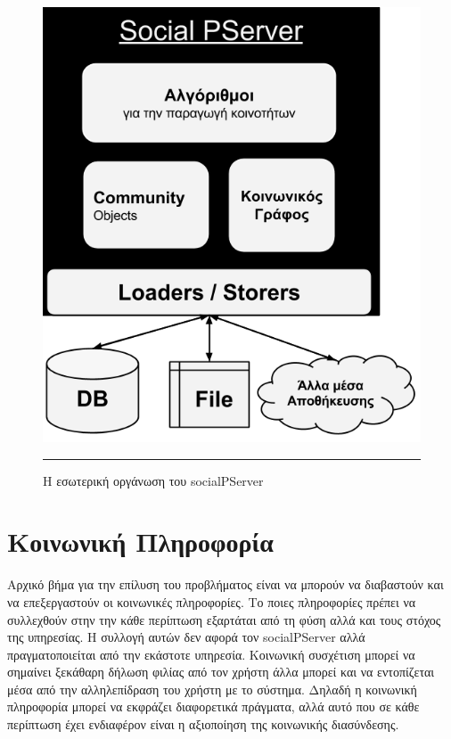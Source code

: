 \begin{figure}[htbp]
  \begin{center}
    \includegraphics[scale=0.60]{Figures/socialPServerComponents.png}
	\rule{35em}{0.5pt}  %
	\caption[PServerArchitecture]{Η εσωτερική οργάνωση του socialPServer}
  \end{center}	
  \label{fig:socialPServerComponents}  
\end{figure}

\vfill

\section{Κοινωνική Πληροφορία}
\noindent
Αρχικό βήμα για την επίλυση του προβλήματος είναι να μπορούν να διαβαστούν και να επεξεργαστούν οι κοινωνικές πληροφορίες.
Το ποιες πληροφορίες πρέπει να συλλεχθούν στην την κάθε περίπτωση εξαρτάται από τη φύση αλλά και τους στόχος της υπηρεσίας.
Η συλλογή αυτών δεν αφορά τον socialPServer αλλά πραγματοποιείται από την εκάστοτε υπηρεσία. 
Κοινωνική συσχέτιση μπορεί να σημαίνει ξεκάθαρη δήλωση φιλίας από τον χρήστη άλλα μπορεί και να εντοπίζεται μέσα από την
αλληλεπίδραση του χρήστη με το σύστημα. Δηλαδή η κοινωνική πληροφορία μπορεί να εκφράζει διαφορετικά πράγματα,
αλλά αυτό που σε κάθε περίπτωση έχει ενδιαφέρον είναι η αξιοποίηση της κοινωνικής διασύνδεσης.

